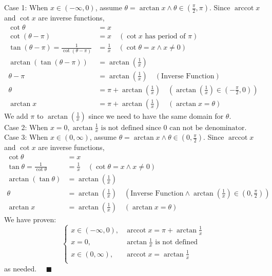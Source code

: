 \documentclass[12pt]{exam}
\DeclareMathOperator{\arccot}{arccot}
\begin{document}
\begin{enumerate}
\begin{enumerate}
	Case 1: When $x\in(-\infty, 0)$, assume $\theta=\arctan x \land \theta \in(\frac{\pi}{2},\pi).$ Since $\arccot x$ and $\cot x$ are inverse functions,
	\begin{align*}
	    \cot\theta&=x\\
	    \cot(\theta-\pi)&=x\quad(\cot x\mbox{ has period of }\pi)\\
	    \tan(\theta-\pi)=\frac{1}{\cot(\theta-\pi)}&=\frac{1}{x}\quad(\cot\theta=x\land x\neq0)\\
	    \arctan(\tan(\theta-\pi))&=\arctan(\frac{1}{x})\\
	    \theta-\pi&=\arctan(\frac{1}{x})\quad(\mbox{Inverse Function})\\
	    \theta&=\pi+\arctan(\frac{1}{x})\quad(\arctan(\frac{1}{x})\in(-\frac{\pi}{2},0))\\
	    \arctan x&=\pi+\arctan(\frac{1}{x})\quad(\arctan x=\theta)
	\end{align*}
	We add $\pi$ to $\arctan(\frac{1}{x})$ since we need to have the same domain for $\theta$.\\
	
	Case 2: When $x=0,\arctan\frac{1}{x} \mbox{ is not defined since 0 can not be denominator.}$\\
	
	Case 3: When $x\in(0, \infty)$, assume $\theta=\arctan x \land \theta \in(0, \frac{\pi}{2}).$ Since $\arccot x$ and $\cot x$ are inverse functions,
	\begin{align*}
	    \cot\theta&=x\\
	    \tan\theta=\frac{1}{\cot\theta}&=\frac{1}{x}\quad(\cot\theta=x\land x\neq0)\\
	    \arctan(\tan\theta)&=\arctan(\frac{1}{x})\\
	    \theta&=\arctan(\frac{1}{x})\quad(\mbox{Inverse Function} \land \arctan(\frac{1}{x})\in (0, \frac{\pi}{2}))\\
	    \arctan x&=\arctan(\frac{1}{x})\quad(\arctan x=\theta)
	\end{align*}
	We have proven:
	$$
	\begin{cases}
	    x\in(-\infty, 0),&\arccot x=\pi+\arctan\frac{1}{x}\\
	    x=0,&\arctan\frac{1}{x} \mbox{ is not defined}\\
	    x\in(0, \infty),&\arccot x=\arctan\frac{1}{x}\\
	\end{cases}
	$$
	\qquad as needed. $\quad\blacksquare$

	\end{enumerate}


\end{enumerate}
\end{document}
